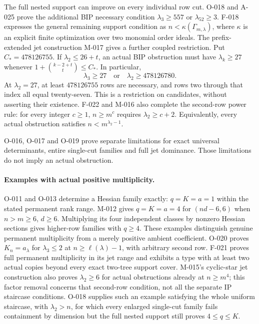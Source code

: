 \documentclass[11pt]{article}
\begin{document}
The full nested support can improve on every individual row cut.
O-018 and A-025 prove the additional BIP necessary condition
\(\lambda_3\geq557\) or \(\lambda_{52}\geq3\).
F-018 expresses the general remaining support condition as
\(n<\kappa(\Gamma_{m,\lambda})\), where \(\kappa\) is an
explicit finite optimization over two monomial order ideals.
The prefix-extended jet construction M-017 gives a further
coupled restriction. Put \(C_*=478126755\). If
\(\lambda_2\leq26+t\), an actual BIP obstruction must have
\(\lambda_k\geq27\) whenever
\(1+\binom{k-2+t}{t}\leq C_*\). In particular,
\[
 \lambda_3\geq27\quad\text{or}\quad\lambda_2\geq478126780.
\]
At \(\lambda_2=27\), at least \(478126755\) rows are
necessary, and rows two through that index all equal twenty-seven.
This is a restriction on candidates, without asserting their existence.
F-022 and M-016 also complete the second-row power rule:
for every integer \(c\geq1\), \(n\geq m^c\) requires
\(\lambda_2\geq c+2\). Equivalently, every actual obstruction
satisfies \(n<m^{\lambda_2-1}\).

O-016, O-017 and O-019 prove separate limitations for exact
universal determinants, entire single-cut families and full jet
dominance. Those limitations do not imply an actual obstruction.

\paragraph{Examples with actual positive multiplicity.}
O-011 and O-013 determine a Hessian family exactly:
\(q=K=a=1\) within the stated permanent rank range.
M-012 gives \(q=K=a=4\) for \((nd-6,6)\) when
\(n>m\geq6\), \(d\geq6\). Multiplying its four independent
classes by nonzero Hessian sections gives higher-row families
with \(q\geq4\). These examples distinguish genuine
permanent multiplicity from a merely positive ambient coefficient.
O-020 proves \(K_n=a_\lambda\) for \(\lambda_3\leq2\)
at \(n\geq\ell(\lambda)-1\), with arbitrary second row.
F-021 proves full permanent multiplicity in its jet range and
exhibits a type with at least two actual copies beyond every
exact two-tree support cover. M-015's cyclic-star jet construction
also proves \(\lambda_2\geq6\) for actual obstructions already
at \(n\geq m^4\); this factor removal concerns that second-row
condition, not all the separate IP staircase conditions.
O-018 supplies such an example satisfying the whole uniform
staircase, with \(\lambda_2>n\), for which every enlarged
single-cut family fails containment by dimension but the full
nested support still proves \(4\leq q\leq K\).
\end{document}
